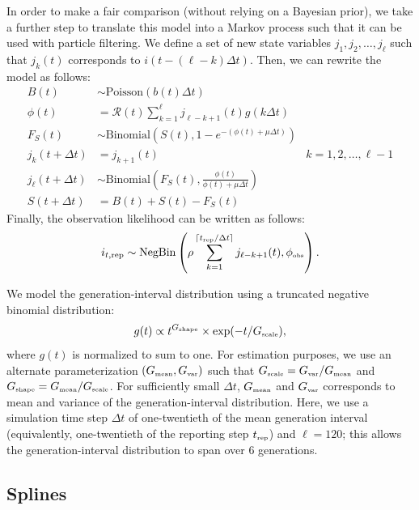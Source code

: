 \documentclass{article}
\newcommand{\tsub}[2]{#1_{{\textrm{\tiny #2}}}}
\begin{document}
In order to make a fair comparison (without relying on a Bayesian prior), we take a further step to translate this model into a Markov process such that it can be used with particle filtering.
We define a set of new state variables $j_1, j_2, \dots, j_\ell$ such that $j_k(t)$ corresponds to $i(t- (\ell-k) \Delta t)$.
Then, we can rewrite the model as follows:
\begin{equation}
\begin{aligned}
B(t) &\sim \mathrm{Poisson}(b(t) \Delta t)\\
\phi(t) &= \mathcal R(t) \sum_{k=1}^\ell j_{\ell-k+1}(t) g(k \Delta t)\\
F_{S}(t) &\sim \mathrm{Binomial}\left(S(t), 1 - e^{-(\phi(t) + \mu \Delta t)} \right)\\
j_k(t+\Delta t) &= j_{k+1}(t) &k=1, 2, \dots, \ell-1\\
j_\ell(t + \Delta t) &\sim \mathrm{Binomial}\left(F_{S}(t), \frac{\phi(t)}{\phi(t) + \mu \Delta t} \right)\\
S(t + \Delta t) &= B(t) + S(t) - F_{S}(t)
\end{aligned}
\end{equation}
Finally, the observation likelihood can be written as follows:
\begin{equation}
i_{t, {\tiny \textrm{rep}}} \sim \mathrm{NegBin}\left(\rho \sum_{k=1}^{\lceil\tsub{t}{rep}/\Delta t\rceil} j_{\ell-k+1}(t) , \tsub{\phi}{obs}\right).
\end{equation}

We model the generation-interval distribution using a truncated negative binomial distribution:
\begin{equation}
g(t) \propto t^{\tsub{G}{shape}} \times \exp(-t/\tsub{G}{scale}),
\end{equation}
where $g(t)$ is normalized to sum to one.
For estimation purposes, we use an alternate parameterization $(\tsub{G}{mean}, \tsub{G}{var})$ such that $\tsub{G}{scale} = \tsub{G}{var}/\tsub{G}{mean}$ and $\tsub{G}{shape} = \tsub{G}{mean}/\tsub{G}{scale}$.
For sufficiently small $\Delta t$, $\tsub{G}{mean}$ and $\tsub{G}{var}$ corresponds to mean and variance of the generation-interval distribution.
Here, we use a simulation time step $\Delta t$ of one-twentieth of the mean generation interval (equivalently, one-twentieth of the reporting step $\tsub{t}{rep}$) and $\ell = 120$; this allows the generation-interval distribution to span over 6 generations.

\subsection{Splines}
\end{document}
